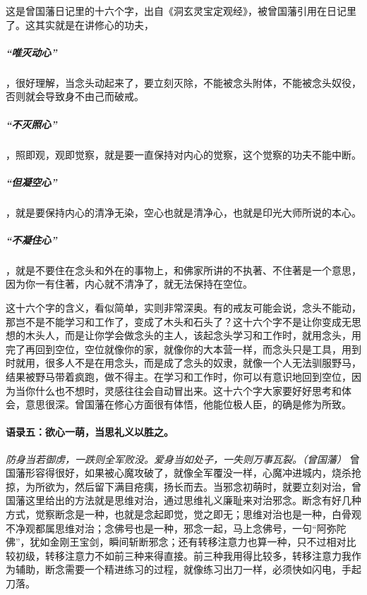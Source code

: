 这是曾国藩日记里的十六个字，出自《洞玄灵宝定观经》，被曾国藩引用在日记里了。这其实就是在讲修心的功夫，

\subparagraph{“唯灭动心”}，很好理解，当念头动起来了，要立刻灭除，不能被念头附体，不能被念头奴役，否则就会导致身不由己而破戒。

\subparagraph{“不灭照心”}，照即观，观即觉察，就是要一直保持对内心的觉察，这个觉察的功夫不能中断。

\subparagraph{“但凝空心”}，就是要保持内心的清净无染，空心也就是清净心，也就是印光大师所说的本心。

\subparagraph{“不凝住心”}，就是不要住在念头和外在的事物上，和佛家所讲的不执著、不住著是一个意思，因为你一有住著，内心就不清净了，就无法保持在空位。

这十六个字的含义，看似简单，实则非常深奥。有的戒友可能会说，念头不能动，那岂不是不能学习和工作了，变成了木头和石头了？这十六个字不是让你变成无思想的木头人，而是让你学会做念头的主人，该起念头学习和工作时，就用念头，用完了再回到空位，空位就像你的家，就像你的大本营一样，而念头只是工具，用到时就用，很多人不是在用念头，而是成了念头的奴隶，就像一个人无法驯服野马，结果被野马带着疯跑，做不得主。在学习和工作时，你可以有意识地回到空位，因为当你什么也不想时，灵感往往会自动冒出来。这十六个字大家要好好思考和体会，意思很深。曾国藩在修心方面很有体悟，他能位极人臣，的确是修为所致。

\paragraph{语录五：欲心一萌，当思礼义以胜之。}

\textit{防身当若御虏，一跌则全军败没。爱身当如处子，一失则万事瓦裂。（曾国藩）} 曾国藩形容得很好，如果被心魔攻破了，就像全军覆没一样，心魔冲进城内，烧杀抢掠，为所欲为，然后留下满目疮痍，扬长而去。当邪念初萌时，就要立刻对治，曾国藩这里给出的方法就是思维对治，通过思维礼义廉耻来对治邪念。断念有好几种方式，觉察断念是一种，也就是念起即觉，觉之即无；思维对治也是一种，白骨观不净观都属思维对治；念佛号也是一种，邪念一起，马上念佛号，一句“阿弥陀佛”，犹如金刚王宝剑，瞬间斩断邪念；还有转移注意力也算一种，只不过相对比较初级，转移注意力不如前三种来得直接。前三种我用得比较多，转移注意力我作为辅助，断念需要一个精进练习的过程，就像练习出刀一样，必须快如闪电，手起刀落。

